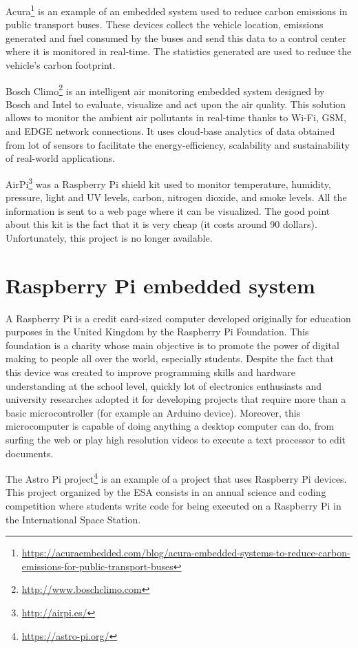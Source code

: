 Acura\footnote{\url{https://acuraembedded.com/blog/acura-embedded-systems-to-reduce-carbon-emissions-for-public-transport-buses}} is an example of an embedded system used to reduce carbon emissions in public transport buses. These devices collect the vehicle location, emissions generated and fuel consumed by the buses and send this data to a control center where it is monitored in real-time. The statistics generated are used to reduce the vehicle's carbon footprint.

Bosch Climo\footnote{\url{http://www.boschclimo.com}} is an intelligent air monitoring embedded system designed by Bosch and Intel to evaluate, visualize and act upon the air quality. This solution allows to monitor the ambient air pollutants in real-time thanks to Wi-Fi, GSM, and EDGE network connections. It uses cloud-base analytics of data obtained from lot of sensors to facilitate the energy-efficiency, scalability and sustainability of real-world applications.

AirPi\footnote{\url{http://airpi.es/}} was a Raspberry Pi shield kit used to monitor temperature, humidity, pressure, light and UV levels, carbon, nitrogen dioxide, and smoke levels. All the information is sent to a web page where it can be visualized. The good point about this kit is the fact that it is very cheap (it costs around 90 dollars).  Unfortunately, this project is no longer available.



\section{Raspberry Pi embedded system}
A Raspberry Pi \cite{RaspberryPi} is a credit card-sized computer developed originally for education purposes in the United Kingdom by the Raspberry Pi Foundation. This foundation is a charity whose main objective is to promote the power of digital making to people all over the world, especially students. Despite the fact that this device was created to improve programming skills and hardware understanding at the school level, quickly lot of electronics enthusiasts and university researches adopted it for developing projects that require more than a basic microcontroller (for example an Arduino device). Moreover, this microcomputer is capable of doing anything a desktop computer can do, from surfing the web or play high resolution videos to execute a text processor to edit documents.

The Astro Pi project\footnote{\url{https://astro-pi.org/}} is an example of a project that uses Raspberry Pi devices. This project organized by the \ac{ESA} consists in an annual science and coding competition where students write code for being executed on a Raspberry Pi in the International Space Station.

